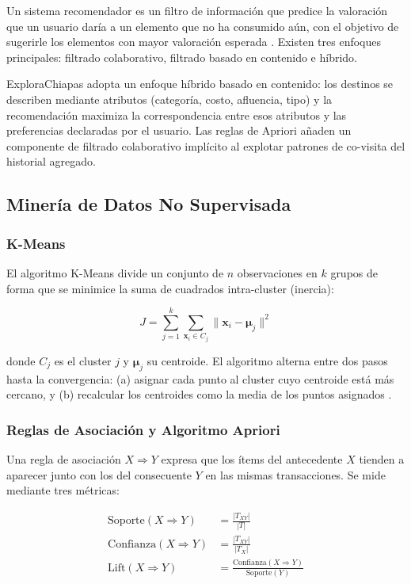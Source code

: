 \documentclass[12pt,letterpaper]{report}
\begin{document}
Un sistema recomendador es un filtro de información que predice la valoración que un usuario
daría a un elemento que no ha consumido aún, con el objetivo de sugerirle los elementos con
mayor valoración esperada \cite{ricci2015}. Existen tres enfoques principales: filtrado
colaborativo, filtrado basado en contenido e híbrido.

ExploraChiapas adopta un enfoque híbrido basado en contenido: los destinos se describen
mediante atributos (categoría, costo, afluencia, tipo) y la recomendación maximiza la
correspondencia entre esos atributos y las preferencias declaradas por el usuario. Las
reglas de Apriori añaden un componente de filtrado colaborativo implícito al explotar
patrones de co-visita del historial agregado.

\subsection{Minería de Datos No Supervisada}

\subsubsection{K-Means}

El algoritmo K-Means divide un conjunto de $n$ observaciones en $k$ grupos de forma que se
minimice la suma de cuadrados intra-cluster (inercia):

\begin{equation}
  J = \sum_{j=1}^{k} \sum_{\mathbf{x}_i \in C_j} \|\mathbf{x}_i - \boldsymbol{\mu}_j\|^2
  \label{eq:kmeans}
\end{equation}

donde $C_j$ es el cluster $j$ y $\boldsymbol{\mu}_j$ su centroide. El algoritmo alterna entre
dos pasos hasta la convergencia: (a) asignar cada punto al cluster cuyo centroide está más
cercano, y (b) recalcular los centroides como la media de los puntos asignados
\cite{macqueen1967}.

\subsubsection{Reglas de Asociación y Algoritmo Apriori}

Una regla de asociación $X \Rightarrow Y$ expresa que los ítems del antecedente $X$ tienden a
aparecer junto con los del consecuente $Y$ en las mismas transacciones. Se mide mediante tres
métricas:

\begin{align}
  \text{Soporte}(X \Rightarrow Y)    &= \frac{|T_{XY}|}{|T|} \label{eq:support} \\[4pt]
  \text{Confianza}(X \Rightarrow Y)  &= \frac{|T_{XY}|}{|T_X|} \label{eq:confidence} \\[4pt]
  \text{Lift}(X \Rightarrow Y)       &= \frac{\text{Confianza}(X \Rightarrow Y)}{\text{Soporte}(Y)} \label{eq:lift}
\end{align}
\end{document}
